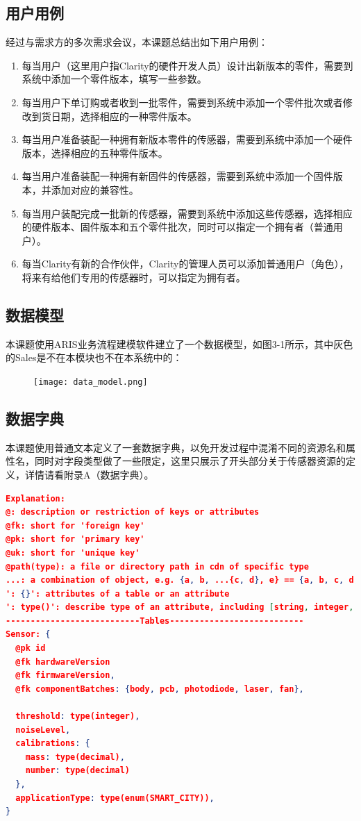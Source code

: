\subsection{用户用例}
经过与需求方的多次需求会议，本课题总结出如下用户用例：
\begin{enumerate}
  \item 每当用户（这里用户指Clarity的硬件开发人员）设计出新版本的零件，需要到系统中添加一个零件版本，填写一些参数。
  \item 每当用户下单订购或者收到一批零件，需要到系统中添加一个零件批次或者修改到货日期，选择相应的一种零件版本。
  \item 每当用户准备装配一种拥有新版本零件的传感器，需要到系统中添加一个硬件版本，选择相应的五种零件版本。
  \item 每当用户准备装配一种拥有新固件的传感器，需要到系统中添加一个固件版本，并添加对应的兼容性。
  \item 每当用户装配完成一批新的传感器，需要到系统中添加这些传感器，选择相应的硬件版本、固件版本和五个零件批次，同时可以指定一个拥有者（普通用户）。
  \item 每当Clarity有新的合作伙伴，Clarity的管理人员可以添加普通用户（角色），将来有给他们专用的传感器时，可以指定为拥有者。
\end{enumerate}
\subsection{数据模型}
本课题使用ARIS业务流程建模软件建立了一个数据模型，如图3-1所示，其中灰色的Sales是不在本模块也不在本系统中的：
\begin{figure}[H]
 \centering
 \texttt{[image: data\_model.png]}
\end{figure}

\subsection{数据字典}
本课题使用普通文本定义了一套数据字典，以免开发过程中混淆不同的资源名和属性名，同时对字段类型做了一些限定，这里只展示了开头部分关于传感器资源的定义，详情请看附录A（数据字典）。
\begin{lstlisting}[language={JSON}, caption={版本管理模块的数据字典}]
Explanation:
@: description or restriction of keys or attributes
@fk: short for 'foreign key'
@pk: short for 'primary key'
@uk: short for 'unique key'
@path(type): a file or directory path in cdn of specific type
...: a combination of object, e.g. {a, b, ...{c, d}, e} == {a, b, c, d, e}
': {}': attributes of a table or an attribute
': type()': describe type of an attribute, including [string, integer, decimal, enum]
---------------------------Tables---------------------------
Sensor: {
  @pk id
  @fk hardwareVersion
  @fk firmwareVersion,
  @fk componentBatches: {body, pcb, photodiode, laser, fan},

  threshold: type(integer),
  noiseLevel,
  calibrations: {
    mass: type(decimal),
    number: type(decimal)
  },
  applicationType: type(enum(SMART_CITY)),
}
\end{lstlisting}


